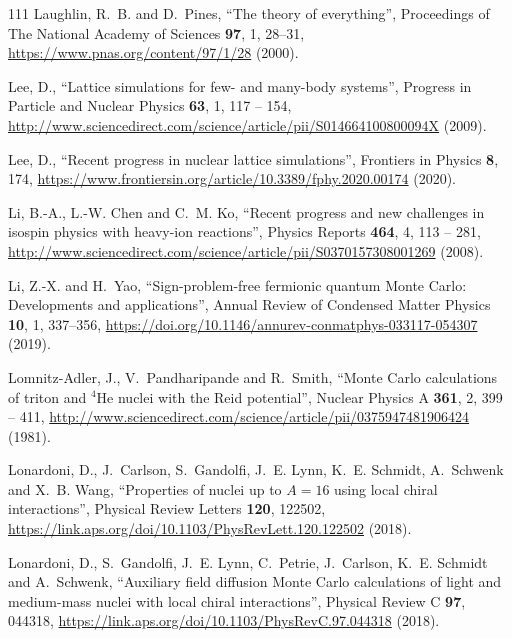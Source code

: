 \documentclass[12pt,letterpaper,UTF8]{report}
\begin{document}
{\begin{thebibliography}{111}
Laughlin, R.~B. and D.~Pines, \enquote{The theory of everything}, Proceedings
  of The National Academy of Sciences \textbf{97}, 1, 28--31,
  \urlprefix\url{https://www.pnas.org/content/97/1/28} (2000).

Lee, D., \enquote{Lattice simulations for few- and many-body systems}, Progress
  in Particle and Nuclear Physics \textbf{63}, 1, 117 -- 154,
  \urlprefix\url{http://www.sciencedirect.com/science/article/pii/S014664100800094X}
  (2009).

Lee, D., \enquote{Recent progress in nuclear lattice simulations}, Frontiers in
  Physics \textbf{8}, 174,
  \urlprefix\url{https://www.frontiersin.org/article/10.3389/fphy.2020.00174}
  (2020).

Li, B.-A., L.-W. Chen and C.~M. Ko, \enquote{Recent progress and new challenges
  in isospin physics with heavy-ion reactions}, Physics Reports \textbf{464},
  4, 113 -- 281,
  \urlprefix\url{http://www.sciencedirect.com/science/article/pii/S0370157308001269}
  (2008).

Li, Z.-X. and H.~Yao, \enquote{Sign-problem-free fermionic quantum {Monte}
  {Carlo}: Developments and applications}, Annual Review of Condensed Matter
  Physics \textbf{10}, 1, 337--356,
  \urlprefix\url{https://doi.org/10.1146/annurev-conmatphys-033117-054307}
  (2019).

Lomnitz-Adler, J., V.~Pandharipande and R.~Smith, \enquote{{Monte} {Carlo}
  calculations of triton and {$^4$He} nuclei with the {Reid} potential},
  Nuclear Physics A \textbf{361}, 2, 399 -- 411,
  \urlprefix\url{http://www.sciencedirect.com/science/article/pii/0375947481906424}
  (1981).

Lonardoni, D., J.~Carlson, S.~Gandolfi, J.~E. Lynn, K.~E. Schmidt, A.~Schwenk
  and X.~B. Wang, \enquote{Properties of nuclei up to {$A=16$} using local
  chiral interactions}, Physical Review Letters \textbf{120}, 122502,
  \urlprefix\url{https://link.aps.org/doi/10.1103/PhysRevLett.120.122502}
  (2018{}).

Lonardoni, D., S.~Gandolfi, J.~E. Lynn, C.~Petrie, J.~Carlson, K.~E. Schmidt
  and A.~Schwenk, \enquote{Auxiliary field diffusion {Monte} {Carlo}
  calculations of light and medium-mass nuclei with local chiral interactions},
  Physical Review C \textbf{97}, 044318,
  \urlprefix\url{https://link.aps.org/doi/10.1103/PhysRevC.97.044318}
  (2018{}).


\end{thebibliography}}
\end{document}
